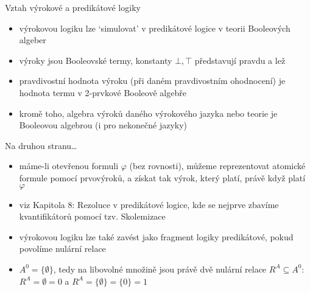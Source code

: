 \documentclass{beamer}
\begin{document}
\begin{frame}{Vztah výrokové a predikátové logiky}
   
    \begin{itemize}
        \item výrokovou logiku lze `simulovat' v predikátové logice v teorii Booleových algeber
        \item výroky jsou \alert{Booleovské termy}, konstanty $\bot,\top$ představují pravdu a lež
        \item pravdivostní hodnota výroku (při daném pravdivostním ohodnocení) je hodnota termu v 2-prvkové Booleově algebře
        \item kromě toho, \alert{algebra výroků} daného výrokového jazyka nebo teorie je Booleovou algebrou (i pro nekonečné jazyky)        
    \end{itemize}
    
\end{frame}

\begin{frame}{Na druhou stranu\dots}

    \begin{itemize}
        \item máme-li \alert{otevřenou} formuli $\varphi$ (bez rovnosti), můžeme reprezentovat atomické formule pomocí prvovýroků, a získat tak výrok, který platí, právě když platí $\varphi$
        \item viz Kapitola 8: Rezoluce v predikátové logice, kde se nejprve zbavíme kvantifikátorů pomocí tzv. \alert{Skolemizace}
        \item výrokovou logiku lze také zavést jako fragment logiky predikátové, pokud povolíme \alert{nulární relace}
        \item $A^0=\{\emptyset\}$, tedy na libovolné množině jsou právě dvě nulární relace $R^A\subseteq A^0$: $R^A=\emptyset=0$ a $R^A=\{\emptyset\}=\{0\}=1$
    \end{itemize}

    
        
\end{frame}
\end{document}
